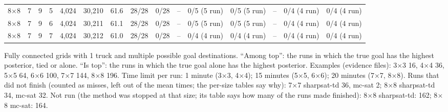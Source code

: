 \documentclass[10pt]{article}
\begin{document}
\begin{lrbox}{\tbl}
\begin{tabular}{rrrrrrrrrrrrrrr}
8$\times$8 & 7 & 9 & 5 & 4,024 & 30,210 & 61.6 & 28/28 & 0/28 & -- & 0/5 (5 run) & 0/5 (5 run) & -- & 0/4 (4 run) & 0/4 (4 run) \\
8$\times$8 & 7 & 9 & 6 & 4,024 & 30,211 & 61.1 & 28/28 & 0/28 & -- & 0/5 (5 run) & 0/5 (5 run) & -- & 0/4 (4 run) & 0/4 (4 run) \\
8$\times$8 & 7 & 9 & 7 & 4,024 & 30,212 & 61.0 & 28/28 & 0/28 & -- & 0/4 (4 run) & 0/4 (4 run) & -- & 0/4 (4 run) & 0/4 (4 run) \\
\bottomrule
\end{tabular}
\end{lrbox}
\noindent{}
\par\bigskip\noindent
\begin{minipage}{\textwidth}\small Fully connected grids with 1 truck and multiple possible goal destinations. ``Among top'': the runs in which the true goal has the highest posterior, tied or alone. ``Is top'': the runs in which the true goal alone has the highest posterior. Examples (evidence files): 3$\times$3 16, 4$\times$4 36, 5$\times$5 64, 6$\times$6 100, 7$\times$7 144, 8$\times$8 196. Time limit per run: 1 minute (3$\times$3, 4$\times$4); 15 minutes (5$\times$5, 6$\times$6); 20 minutes (7$\times$7, 8$\times$8). Runs that did not finish (counted as misses, left out of the mean times; the per-size tables say why): 7$\times$7 sharpsat-td 36, mc-sat 2; 8$\times$8 sharpsat-td 34, mc-sat 32. Not run (the method was stopped at that size; its table says how many of the runs made finished): 8$\times$8 sharpsat-td: 162; 8$\times$8 mc-sat: 164.\end{minipage}
\end{document}

